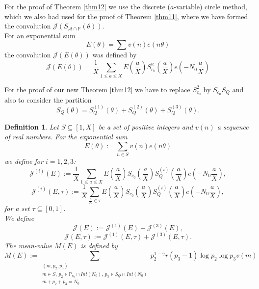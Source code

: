 \documentclass{amsart}
\numberwithin{equation}{subsection}
\newtheorem{definition}[theorem]{Definition}
\begin{document}
For the proof of Theorem \ref{thm12} we use the discrete ($a$-variable) circle method, which we also had used for the proof of Theorem \ref{thm11}, where we have formed the convolution $\mathcal{J}(S_{\mathcal{A}\cap\mathbb{P}}(\theta))$.\\
For an exponential sum 
$$E(\theta)=\sum v(n)e(n\theta)$$
the convolution $\mathcal{J}(E(\theta))$ was defined by
$$\mathcal{J}(E(\theta))=\frac{1}{X}\sum_{1\leq a\leq X} E\left(\frac{a}{X}\right) S_{c_0}^2\left(\frac{a}{X}\right) e\left(-N_0\frac{a}{X}\right)$$


For the proof of our new Theorem \ref{thm12} we have to replace $S_{c_0}^2$ by $S_{c_0}S_Q$ and also to consider the partition 
$$S_Q(\theta)=S_Q^{(1)}(\theta)+S_Q^{(2)}(\theta)+S_Q^{(3)}(\theta).$$

\begin{definition}\label{def24}
Let $S\subseteq [1,X]$ be a set of positive integers and $v(n)$ a sequence of real numbers. For the exponential sum
$$E(\theta):=\sum_{n\in S} v(n)e(n\theta)$$
we define for $i=1, 2, 3$: 
$$\mathcal{J}^{(i)}(E):=\frac{1}{X}\sum_{1\leq a\leq X} E\left(\frac{a}{X}\right) S_{c_0}\left(\frac{a}{X}\right) S_Q^{(i)}\left(\frac{a}{X}\right) e\left(-N_0\frac{a}{X}\right),$$
$$\mathcal{J}^{(i)}(E, \tau):=\frac{1}{X}\sum_{\frac{a}{X}\in\tau} E\left(\frac{a}{X}\right) S_{c_0}\left(\frac{a}{X}\right) S_Q^{(i)}\left(\frac{a}{X}\right) e\left(-N_0\frac{a}{X}\right),$$
for a set $\tau\subseteq [0,1]$.\\
We define 
$$\mathcal{J}(E):=\mathcal{J}^{(1)}(E)+\mathcal{J}^{(3)}(E),$$
$$\mathcal{J}(E, \tau):=\mathcal{J}^{(1)}(E, \tau)+\mathcal{J}^{(3)}(E, \tau).$$
The mean-value $M(E)$ is defined by
$$M(E):=\sum_{\substack{(m,p_2,p_3) \\ m\in S,\ p_2\in\mathbb{P}_{c_0}\cap Int(N_0),\ p_3\in S_Q\cap Int(N_0) \\ m+p_2+p_3=N_0 }} p_2^{1-\gamma}r(p_3-1)\log p_2 \log p_3 v(m)$$
\end{definition}
\end{document}
